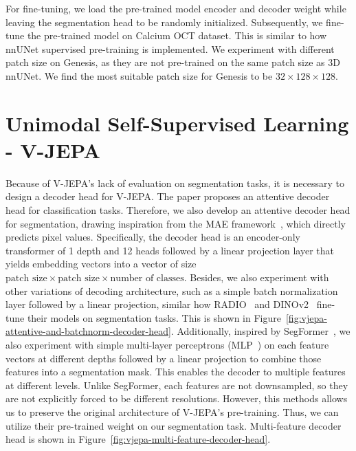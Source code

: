 \documentclass[a4paper,11pt,oneside]{report}
\begin{document}
For fine-tuning, we load the pre-trained model encoder and decoder weight while leaving the segmentation head to be randomly initialized. Subsequently, we fine-tune the pre-trained model on Calcium OCT dataset. This is similar to how nnUNet supervised pre-training is implemented. We experiment with different patch size on Genesis, as they are not pre-trained on the same patch size as 3D nnUNet. We find the most suitable patch size for Genesis to be $32\times 128\times 128$.

\section{Unimodal Self-Supervised Learning - V-JEPA}\label{sec:implementation:vjepa}
Because of V-JEPA's lack of evaluation on segmentation tasks, it is necessary to design a decoder head for V-JEPA. The paper proposes an attentive decoder head for classification tasks. Therefore, we also develop an attentive decoder head for segmentation, drawing inspiration from the MAE framework~\cite{He2022}, which directly predicts pixel values. Specifically, the decoder head is an encoder-only transformer of 1 depth and 12 heads followed by a linear projection layer that yields embedding vectors into a vector of size \(\text{patch size} \times \text{patch size} \times \text{number of classes}\). Besides, we also experiment with other variations of decoding architecture, such as a simple batch normalization layer followed by a linear projection, similar how RADIO~\cite{Ranzinger2024RADIO} and DINOv2~\cite{Oquab2024dinov} fine-tune their models on segmentation tasks. This is shown in Figure~\ref{fig:vjepa-attentive-and-batchnorm-decoder-head}. Additionally, inspired by SegFormer~\cite{Xie2021SegFormer}, we also experiment with simple multi-layer perceptrons (MLP~\cite{Rumelhart1986}) on each feature vectors at different depths followed by a linear projection to combine those features into a segmentation mask. This enables the decoder to multiple features at different levels. Unlike SegFormer, each features are not downsampled, so they are not explicitly forced to be different resolutions. However, this methods allows us to preserve the original architecture of V-JEPA's pre-training. Thus, we can utilize their pre-trained weight on our segmentation task. Multi-feature decoder head is shown in Figure~\ref{fig:vjepa-multi-feature-decoder-head}.
\end{document}
